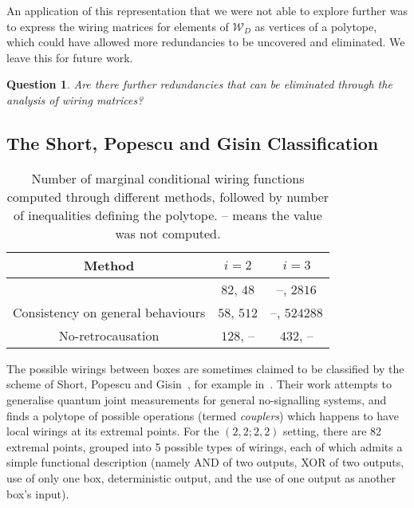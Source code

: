 \documentclass[10pt, a4paper]{article}
\numberwithin{equation}{section} %
\theoremstyle{definition}
\theoremstyle{plain}
\newtheorem{question}{Question}
\newenvironment{Tabular}[1] %
{\def\arraystretch{1.75}\begin{tabular}{#1}}
{\end{tabular}}
\newcommand{\?}{\mathrel{?}} %
\newcommand{\sW}{\mathcal{W}}
\begin{document}
                  An application of this representation that we were not able to explore further was to express the wiring matrices for elements of \(\sW_D\) as vertices of a polytope, which could have allowed more redundancies to be uncovered and eliminated. We leave this for future work.
                  \begin{question}
                    Are there further redundancies that can be eliminated through the analysis of wiring matrices?
                  \end{question}

                  \subsection{The Short, Popescu and Gisin Classification}\label{sec:locwir_SPG}

              \begin{table}
                  \centering
                      \begin{Tabular}{ccc} 
                        \toprule
                        Method & \(i = 2\) & \(i = 3\) \\
                        \midrule
                        \cite{ShortEntangleSwap} & \(82\), \(48\)  & --, \(2816\) \\
                        Consistency on general behaviours & \(58\), \(512\) & --, \(524288\) \\
                        No-retrocausation & \(128\), -- & \(432\), -- \\
                        \bottomrule
                      \end{Tabular}
                      \caption{Number of marginal conditional wiring functions computed through different methods, followed by number of inequalities defining the polytope. -- means the value was not computed.}\label{tab:polys}
              \end{table}

                  The possible wirings between boxes are sometimes claimed to be classified by the scheme of Short, Popescu and Gisin~\cite{ShortEntangleSwap}, for example in~\cite{ShortClassClaim}. Their work attempts to generalise quantum joint measurements for general no-signalling systems, and finds a polytope of possible operations (termed \emph{couplers}) which happens to have local wirings at its extremal points. For the  \((2,2;2,2)\) setting, there are 82 extremal points, grouped into 5 possible types of wirings, each of which admits a simple functional description (namely AND of two outputs, XOR of two outputs, use of only one box, deterministic output, and the use of one output as another box's input).
\end{document}
